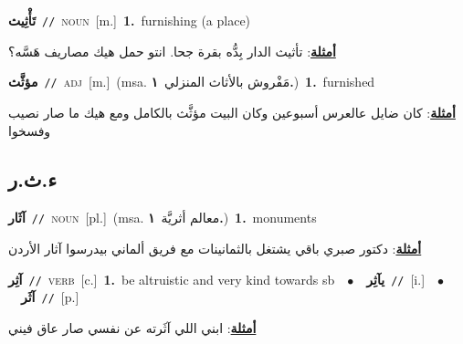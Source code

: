 \documentclass[10pt,a4paper,twoside]{article} %
\begin{document}
\begin{multicols}{2}
{{{{\setlength\topsep{0pt}\textbf{\foreignlanguage{arabic}{تَأْثِيث}}\ {\color{gray}\texttt{//}\color{black}}\ \textsc{noun}\ [m.]\ \textbf{1.}~furnishing (a place)\  \begin{flushright}\color{gray}\foreignlanguage{arabic}{\textbf{\underline{\foreignlanguage{arabic}{أمثلة}}}: تأثيث الدار بِدُّه بقرة جحا. انتو حمل هيك مصاريف هَسَّه؟}\end{flushright}\color{black}} \vspace{2mm}

{\setlength\topsep{0pt}\textbf{\foreignlanguage{arabic}{مؤثَّث}}\ {\color{gray}\texttt{//}\color{black}}\ \textsc{adj}\ [m.]\ \color{gray}(msa. \foreignlanguage{arabic}{مَفْروش بالأثاث المنزلي}~\foreignlanguage{arabic}{\textbf{١.}})\color{black}\ \textbf{1.}~furnished\  \begin{flushright}\color{gray}\foreignlanguage{arabic}{\textbf{\underline{\foreignlanguage{arabic}{أمثلة}}}: كان ضايل عالعرس أسبوعين وكان البيت مؤثَّث بالكامل ومع هيك ما صار نصيب وفسخوا}\end{flushright}\color{black}} \vspace{2mm}

\vspace{-3mm}
\subsection*{\color{blue}\foreignlanguage{arabic}{ء.ث.ر}\color{blue}{}} 

{\setlength\topsep{0pt}\textbf{\foreignlanguage{arabic}{آثَار}}\ {\color{gray}\texttt{//}\color{black}}\ \textsc{noun}\ [pl.]\ \color{gray}(msa. \foreignlanguage{arabic}{معالم أثريَّة}~\foreignlanguage{arabic}{\textbf{١.}})\color{black}\ \textbf{1.}~monuments\  \begin{flushright}\color{gray}\foreignlanguage{arabic}{\textbf{\underline{\foreignlanguage{arabic}{أمثلة}}}: دكتور صبري باقي يشتغل بالثمانينات مع فريق ألماني بيدرسوا آثار الأردن}\end{flushright}\color{black}} \vspace{2mm}

{\setlength\topsep{0pt}\textbf{\foreignlanguage{arabic}{آثِر}}\ {\color{gray}\texttt{//}\color{black}}\ \textsc{verb}\ [c.]\ \textbf{1.}~be altruistic and very kind towards sb\ \ $\bullet$\ \ \setlength\topsep{0pt}\textbf{\foreignlanguage{arabic}{يآثِر}}\ {\color{gray}\texttt{//}\color{black}}\ [i.]\ \ $\bullet$\ \ \setlength\topsep{0pt}\textbf{\foreignlanguage{arabic}{آثَر}}\ {\color{gray}\texttt{//}\color{black}}\ [p.]\  \begin{flushright}\color{gray}\foreignlanguage{arabic}{\textbf{\underline{\foreignlanguage{arabic}{أمثلة}}}: ابني اللي آثَرته عن نفسي صار عاق فيني}\end{flushright}\color{black}} \vspace{2mm}

}}}
\end{multicols}
\end{document}
